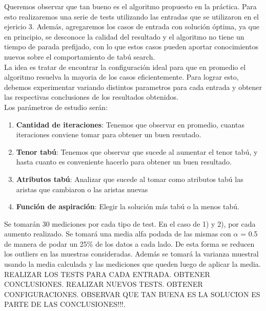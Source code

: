 Queremos observar que tan bueno es el algoritmo propuesto en la práctica. Para esto realizaremos una serie de tests utilizando las entradas que se utilizaron en el ejericio 3. Además, agregaremos los casos de entrada con solución óptima, ya que en principio, se desconoce la calidad del resultado y el algoritmo no tiene un tiempo de parada prefijado, con lo que estos casos pueden aportar conocimientos nuevos sobre el comportamiento de tabú search.\\
La idea es tratar de encontrar la configuración ideal para que en promedio el algoritmo resuelva la mayoria de los casos eficientemente. Para lograr esto, debemos experimentar variando distintos parametros para cada entrada y obtener las respectivas conclusiones de los resultados obtenidos.\\
Los parámetros de estudio serán:

\begin{enumerate}
\item  \textbf{Cantidad de iteraciones}: Tenemos que observar en promedio, cuantas iteraciones conviene tomar para obtener un buen resutado.
\item \textbf{Tenor tabú}: Tenemos que observar que sucede al aumentar el tenor tabú, y hasta cuanto es conveniente hacerlo para obtener un buen resultado.
\item \textbf{Atributos tabú}: Analizar que sucede al tomar como atributos tabú las aristas que cambiaron o las aristas nuevas
\item \textbf{Función de aspiración}: Elegir la solución más tabú o la menos tabú.
\end{enumerate}

Se tomarán 30 mediciones por cada tipo de test. En el caso de 1) y 2), por cada aumento realizado. Se tomará una media alfa podada de las mismas con $\alpha$ = 0.5 de manera de podar un 25\% de los datos a cada lado. De esta forma se reducen los outliers en las muestras consideradas. 
Además se tomará la varianza muestral usando la media calculada y las mediciones que queden luego de aplicar la media.\\

REALIZAR LOS TESTS PARA CADA ENTRADA. OBTENER CONCLUSIONES. REALIZAR NUEVOS TESTS. OBTENER CONFIGURACIONES. OBSERVAR QUE TAN BUENA ES LA SOLUCION ES PARTE DE LAS CONCLUSIONES!!!.
